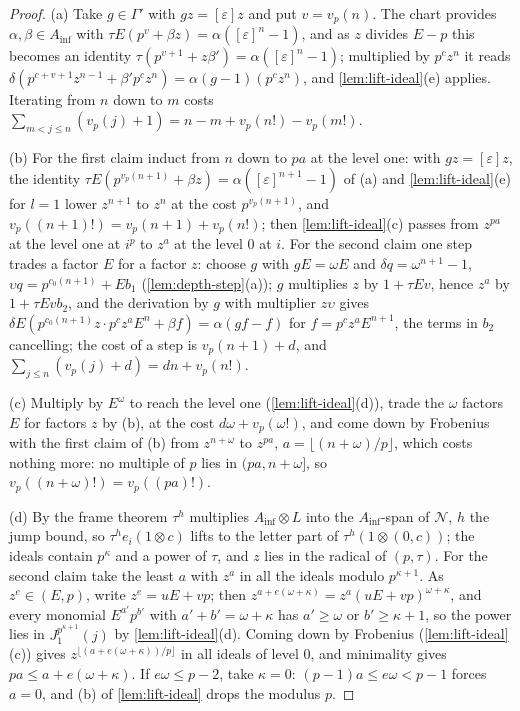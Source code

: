 \begin{proof}
(a) Take $g\in\Gamma'$ with $gz=[\varepsilon]z$ and put $v=v_p(n)$. The chart provides $\alpha,\beta\in A_{\inf}$ with $\tau E(p^v+\beta z)=\alpha([\varepsilon]^n-1)$, and as $z$ divides $E-p$ this becomes an identity $\tau(p^{v+1}+z\beta')=\alpha([\varepsilon]^n-1)$;
multiplied by $p^cz^n$ it reads $\delta(p^{c+v+1}z^{n-1}+\beta'p^cz^n)=\alpha(g-1)(p^cz^n)$, and \cref{lem:lift-ideal}(e) applies. Iterating from $n$ down to $m$ costs $\sum_{m<j\le n}(v_p(j)+1)=n-m+v_p(n!)-v_p(m!)$.

(b) For the first claim induct from $n$ down to $pa$ at the level one: with $gz=[\varepsilon]z$, the identity $\tau E(p^{v_p(n+1)}+\beta z)=\alpha([\varepsilon]^{n+1}-1)$ of (a) and \cref{lem:lift-ideal}(e) for $l=1$ lower $z^{n+1}$ to $z^n$ at the cost $p^{v_p(n+1)}$, and $v_p((n+1)!)=v_p(n+1)+v_p(n!)$; then \cref{lem:lift-ideal}(c) passes from
$z^{pa}$ at the level one at $i^p$ to $z^a$ at the level $0$ at $i$. For the second claim one step trades a factor $E$ for a factor $z$: choose $g$ with $gE=\omega E$ and $\delta q=\omega^{n+1}-1$, $\upsilon q=p^{c_0(n+1)}+Eb_1$ (\cref{lem:depth-step}(a)); $g$ multiplies $z$ by $1+\tau Ev$, hence $z^a$
by $1+\tau Evb_2$, and the derivation by $g$ with multiplier $z\upsilon$ gives $\delta E(p^{c_0(n+1)}z\cdot p^cz^aE^n+\beta f)=\alpha(gf-f)$ for $f=p^cz^aE^{n+1}$, the terms in $b_2$ cancelling; the cost of a step is $v_p(n+1)+d$, and $\sum_{j\le n}(v_p(j)+d)=dn+v_p(n!)$.

(c) Multiply by $E^\omega$ to reach the level one (\cref{lem:lift-ideal}(d)), trade the $\omega$ factors $E$ for factors $z$ by (b), at the cost $d\omega+v_p(\omega!)$, and come down by Frobenius with the first claim of (b) from $z^{n+\omega}$ to $z^{pa}$, $a=\lfloor(n+\omega)/p\rfloor$, which costs nothing more: no multiple of $p$ lies in $(pa,n+\omega]$, so $v_p((n+\omega)!)=v_p((pa)!)$.

(d) By the frame theorem $\tau^h$ multiplies $A_{\inf}\otimes L$ into the $A_{\inf}$-span of $\mathcal N$, $h$ the jump bound, so $\tau^h e_i(1\otimes c)$ lifts to the letter part of $\tau^h(1\otimes(0,c))$; the ideals contain $p^\kappa$ and a power of $\tau$, and $z$ lies in the radical of $(p,\tau)$. For the second claim take the
least $a$ with $z^a$ in all the ideals modulo $p^{\kappa+1}$. As $z^e\in(E,p)$, write $z^e=uE+vp$; then $z^{a+e(\omega+\kappa)}=z^a(uE+vp)^{\omega+\kappa}$, and every monomial $E^{a'}p^{b'}$ with $a'+b'=\omega+\kappa$ has $a'\ge\omega$ or $b'\ge\kappa+1$, so the power lies in $J^{p^{\kappa+1}}_1(j)$
by \cref{lem:lift-ideal}(d). Coming down by Frobenius (\cref{lem:lift-ideal}(c)) gives $z^{\lfloor(a+e(\omega+\kappa))/p\rfloor}$ in all ideals of level $0$, and minimality gives $pa\le a+e(\omega+\kappa)$. If $e\omega\le p-2$, take $\kappa=0$: $(p-1)a\le e\omega<p-1$ forces $a=0$, and (b) of \cref{lem:lift-ideal}
drops the modulus $p$.


\end{proof}
